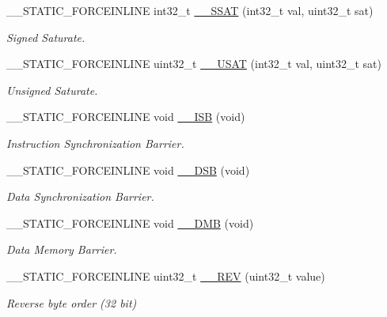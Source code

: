\begin{DoxyCompactItemize}
\+\_\+\+\_\+\+S\+T\+A\+T\+I\+C\+\_\+\+F\+O\+R\+C\+E\+I\+N\+L\+I\+NE int32\+\_\+t \mbox{\hyperlink{group___c_m_s_i_s___core___instruction_interface_ga372c0535573dde3e37f0f08c774a3487}{\+\_\+\+\_\+\+S\+S\+AT}} (int32\+\_\+t val, uint32\+\_\+t sat)
\begin{DoxyCompactList}\small\item\em Signed Saturate. \end{DoxyCompactList}\item 
\+\_\+\+\_\+\+S\+T\+A\+T\+I\+C\+\_\+\+F\+O\+R\+C\+E\+I\+N\+L\+I\+NE uint32\+\_\+t \mbox{\hyperlink{group___c_m_s_i_s___core___instruction_interface_ga6562dbd8182d1571e22dbca7ebdfa9bc}{\+\_\+\+\_\+\+U\+S\+AT}} (int32\+\_\+t val, uint32\+\_\+t sat)
\begin{DoxyCompactList}\small\item\em Unsigned Saturate. \end{DoxyCompactList}\item 
\+\_\+\+\_\+\+S\+T\+A\+T\+I\+C\+\_\+\+F\+O\+R\+C\+E\+I\+N\+L\+I\+NE void \mbox{\hyperlink{group___c_m_s_i_s___core___instruction_interface_gae26c2b3961e702aeabc24d4984ebd369}{\+\_\+\+\_\+\+I\+SB}} (void)
\begin{DoxyCompactList}\small\item\em Instruction Synchronization Barrier. \end{DoxyCompactList}\item 
\+\_\+\+\_\+\+S\+T\+A\+T\+I\+C\+\_\+\+F\+O\+R\+C\+E\+I\+N\+L\+I\+NE void \mbox{\hyperlink{group___c_m_s_i_s___core___instruction_interface_ga7fe277f5385d23b9c44b2cbda1577ce9}{\+\_\+\+\_\+\+D\+SB}} (void)
\begin{DoxyCompactList}\small\item\em Data Synchronization Barrier. \end{DoxyCompactList}\item 
\+\_\+\+\_\+\+S\+T\+A\+T\+I\+C\+\_\+\+F\+O\+R\+C\+E\+I\+N\+L\+I\+NE void \mbox{\hyperlink{group___c_m_s_i_s___core___instruction_interface_gab1ea24daaaaee9c828f90cbca330cb5e}{\+\_\+\+\_\+\+D\+MB}} (void)
\begin{DoxyCompactList}\small\item\em Data Memory Barrier. \end{DoxyCompactList}\item 
\+\_\+\+\_\+\+S\+T\+A\+T\+I\+C\+\_\+\+F\+O\+R\+C\+E\+I\+N\+L\+I\+NE uint32\+\_\+t \mbox{\hyperlink{group___c_m_s_i_s___core___instruction_interface_gadb92679719950635fba8b1b954072695}{\+\_\+\+\_\+\+R\+EV}} (uint32\+\_\+t value)
\begin{DoxyCompactList}\small\item\em Reverse byte order (32 bit) \end{DoxyCompactList}\item 

\end{DoxyCompactItemize}

